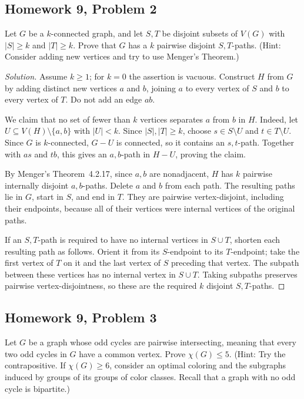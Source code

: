 \documentclass[12pt]{amsart}
\newenvironment{solution}{\begin{proof}[Solution]}{\end{proof}}
\begin{document}
    \subsection*{Homework 9, Problem 2} Let $G$ be a $k$-connected graph, and let $S,T$ be disjoint subsets
    of $V(G)$ with $|S|\ge k$ and $|T|\ge k$.
    Prove that $G$ has a $k$ pairwise disjoint $S,T$-paths.
    (Hint: Consider adding new vertices and try to use Menger's Theorem.)

    \begin{solution}
        Assume $k\geq1$; for $k=0$ the assertion is vacuous.
        Construct $H$ from $G$ by adding distinct new vertices $a$ and $b$,
        joining $a$ to every vertex of $S$ and $b$ to every vertex of $T$.
        Do not add an edge $ab$.

        We claim that no set of fewer than $k$ vertices separates $a$ from $b$
        in $H$.  Indeed, let $U\subseteq V(H)\setminus\{a,b\}$ with $|U|<k$.
        Since $|S|,|T|\geq k$, choose $s\in S\setminus U$ and
        $t\in T\setminus U$.  Since $G$ is $k$-connected, $G-U$ is connected,
        so it contains an $s,t$-path.  Together with $as$ and $tb$, this gives
        an $a,b$-path in $H-U$, proving the claim.

        By Menger's Theorem~4.2.17, since $a,b$ are nonadjacent, $H$ has $k$
        pairwise internally disjoint $a,b$-paths.  Delete $a$ and $b$ from each
        path.  The resulting paths lie in $G$, start in $S$, and end in $T$.
        They are pairwise vertex-disjoint, including their endpoints, because
        all of their vertices were internal vertices of the original paths.

        If an $S,T$-path is required to have no internal vertices in
        $S\cup T$, shorten each resulting path as follows.  Orient it from its
        $S$-endpoint to its $T$-endpoint; take the first vertex of $T$ on it
        and the last vertex of $S$ preceding that vertex.  The subpath between
        these vertices has no internal vertex in $S\cup T$.  Taking subpaths
        preserves pairwise vertex-disjointness, so these are the required $k$
        disjoint $S,T$-paths.
    \end{solution}

    \subsection*{Homework 9, Problem 3} Let $G$ be a graph whose odd cycles are pairwise intersecting,
    meaning that every two odd cycles in $G$ have a common vertex.
    Prove $\chi(G)\le 5$.
    (Hint: Try the contrapositive.
    If $\chi(G)\ge 6$, consider an optimal coloring and the subgraphs induced by groups of
    its groups of color classes.
    Recall that a graph with no odd cycle is bipartite.)
\end{document}

